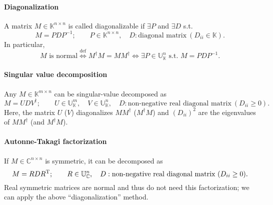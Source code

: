 \documentclass[CheatSheet]{subfiles}
\begin{document}
\paragraph{Diagonalization}
A matrix $M\in\mathbb K^{n\times n}$ is called diagonalizable if $\exists P$ and $\exists D$ s.t.
\begin{equation}
 M=PDP^{-1};\qquad
 P\in\mathbb{K}^{n\times n},\quad
 D:\text{diagonal matrix}~(D_{ii}\in\mathbb{K}).
\end{equation}
In particular,
\begin{equation}
 \text{$M$ is normal} \stackrel{\text{def}}\iff M^\dagger M = M M^\dagger \iff
 \exists P\in\mathbb{U}_{\mathbb K}^{n} \text{~s.t.~} M=PDP^{-1}.
\end{equation}


\paragraph{Singular value decomposition}
Any $M\in\mathbb{K}^{m\times n}$ can be singular-value decomposed as
\begin{equation}
 M=UDV^\dagger;\qquad
 U\in\mathbb{U}_{\mathbb K}^m,\quad
 V\in\mathbb{U}_{\mathbb K}^n,\quad
 D: \text{non-negative real diagonal matrix}~(D_{ii}\ge0).
\end{equation}
Here, the matrix $U$ ($V$) diagonalizes $MM^\dagger$ ($M^\dagger M$) and $(D_{ii})^2$ are the eigenvalues of $MM^\dagger$ (and $M^\dagger M$).


\paragraph{Autonne-Takagi factorization}
If $M\in\mathbb{C}^{n\times n}$ is symmetric, it can be decomposed as
\begin{equation}
 M=RDR^{\mathrm{T}};\qquad
 R\in\mathbb{U}_{\mathbb C}^n,\quad
 D: \text{non-negative real diagonal matrix}~(D_{ii}\ge0).
\end{equation}
Real symmetric matrices are normal and thus do not need this factorization; we can apply the above ``diagonalization'' method.
\end{document}
